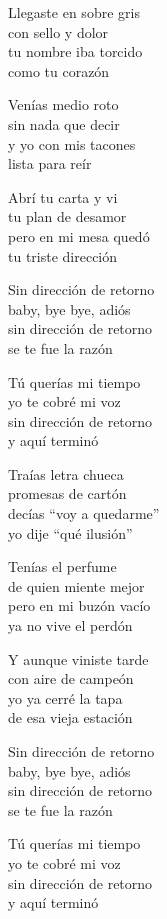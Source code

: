 \begin{lyrics}
Llegaste en sobre gris\\
con sello y dolor\\
tu nombre iba torcido\\
como tu corazón

Venías medio roto\\
sin nada que decir\\
y yo con mis tacones\\
lista para reír

Abrí tu carta y vi\\
tu plan de desamor\\
pero en mi mesa quedó\\
tu triste dirección

Sin dirección de retorno\\
baby, bye bye, adiós\\
sin dirección de retorno\\
se te fue la razón

Tú querías mi tiempo\\
yo te cobré mi voz\\
sin dirección de retorno\\
y aquí terminó

Traías letra chueca\\
promesas de cartón\\
decías “voy a quedarme”\\
yo dije “qué ilusión”

Tenías el perfume\\
de quien miente mejor\\
pero en mi buzón vacío\\
ya no vive el perdón

Y aunque viniste tarde\\
con aire de campeón\\
yo ya cerré la tapa\\
de esa vieja estación

Sin dirección de retorno\\
baby, bye bye, adiós\\
sin dirección de retorno\\
se te fue la razón

Tú querías mi tiempo\\
yo te cobré mi voz\\
sin dirección de retorno\\
y aquí terminó


\end{lyrics}
